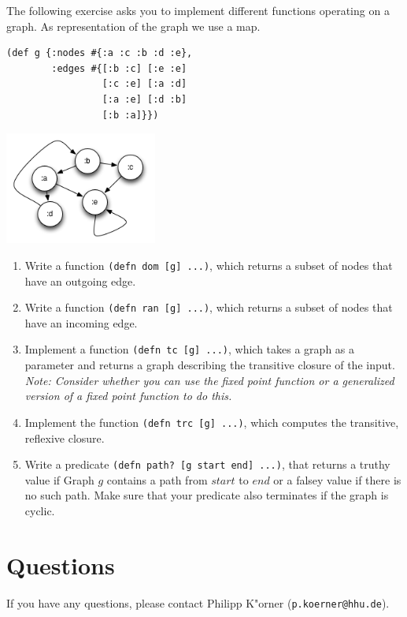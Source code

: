 \documentclass[11pt,a4paper]{article}
\begin{document}
\begin{exercise}[Graph]
The following exercise asks you to implement different functions operating on a graph. As representation of the graph we use a map.

\begin{multicols}{2}[]
\begin{verbatim}
(def g {:nodes #{:a :c :b :d :e}, 
        :edges #{[:b :c] [:e :e] 
                 [:c :e] [:a :d] 
                 [:a :e] [:d :b] 
                 [:b :a]}})
\end{verbatim}

\includegraphics[width=5cm]{graph}

\end{multicols}



\begin{enumerate}[label=\alph*)]
  \item Write a function \texttt{(defn dom [g] ...)}, which returns a subset of nodes that have an outgoing edge.
  \item Write a function \texttt{(defn ran [g] ...)}, which returns a subset of nodes that have an incoming edge.
  \item Implement a function \texttt{(defn tc [g] ...)}, which takes a graph as a parameter and returns a graph describing the transitive closure of the input. {\it Note: Consider whether you can use the fixed point function or a generalized version of a fixed point function to do this.}
  
  \item Implement the function \texttt{(defn trc [g] ...)}, which computes the transitive, reflexive closure.

  \item Write a predicate \texttt{(defn path? [g start end] ...)}, that returns a truthy value if Graph $g$ contains a path from $start$ to $end$ or a falsey value if there is no such path. Make sure that your predicate also terminates if the graph is cyclic.
\end{enumerate}
\end{exercise}


\section*{Questions}
If you have any questions, please contact Philipp K"orner (\texttt{p.koerner@hhu.de}).
\end{document}
